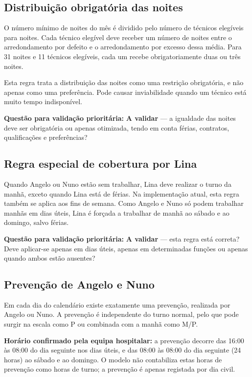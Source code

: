 \documentclass[11pt,a4paper]{article}
\newcommand{\validar}{\textcolor{blue!70!black}{\textbf{A validar}}}
\begin{document}
\subsection{Distribuição obrigatória das noites}

O número mínimo de noites do mês é dividido pelo número de técnicos elegíveis
para noites. Cada técnico elegível deve receber um número de noites entre o
arredondamento por defeito e o arredondamento por excesso dessa média. Para 31
noites e 11 técnicos elegíveis, cada um recebe obrigatoriamente duas ou três
noites.

Esta regra trata a distribuição das noites como uma restrição obrigatória, e não
apenas como uma preferência. Pode causar inviabilidade quando um técnico está
muito tempo indisponível.

\textbf{Questão para validação prioritária:} \validar{} --- a igualdade das
noites deve ser obrigatória ou apenas otimizada, tendo em conta férias,
contratos, qualificações e preferências?

\subsection{Regra especial de cobertura por Lina}

Quando Angelo ou Nuno estão sem trabalhar, Lina deve realizar o turno da manhã,
exceto quando Lina está de férias. Na implementação atual, esta regra também se
aplica aos fins de semana. Como Angelo e Nuno só podem trabalhar manhãs em dias
úteis, Lina é forçada a trabalhar de manhã ao sábado e ao domingo, salvo férias.

\textbf{Questão para validação prioritária:} \validar{} --- esta regra está
correta? Deve aplicar-se apenas em dias úteis, apenas em determinadas funções ou
apenas quando ambos estão ausentes?

\subsection{Prevenção de Angelo e Nuno}

Em cada dia do calendário existe exatamente uma prevenção, realizada por Angelo
ou Nuno. A prevenção é independente do turno normal, pelo que pode surgir na
escala como P ou combinada com a manhã como M/P.

\textbf{Horário confirmado pela equipa hospitalar:} a prevenção decorre das
16:00 às 08:00 do dia seguinte nos dias úteis, e das 08:00 às 08:00 do dia
seguinte (24 horas) ao sábado e ao domingo. O modelo não contabiliza estas
horas de prevenção como horas de turno; a prevenção é apenas registada por dia
civil.
\end{document}
